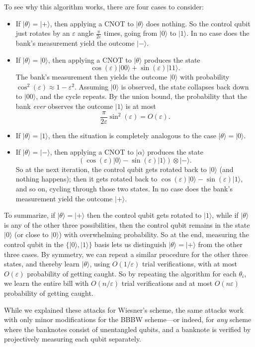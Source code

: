 \documentclass[11pt]{report}
\theoremstyle{plain}
\theoremstyle{definition}
\newcommand{\eps}{\varepsilon}
\renewcommand{\ket}[1]{|#1\rangle}
\begin{document}
To see why this algorithm works, there are four cases to consider:

\begin{itemize}
\item If $\ket{\theta}=\ket{+}$, then applying a CNOT to $\ket{\theta}$ does nothing.  So the control qubit just rotates by an $\eps$ angle $\frac{\pi}{2 \eps}$ times, going from $\ket{0}$ to $\ket{1}$. In no case does the bank's measurement yield the outcome $\ket{-}$.
\item If $\ket{\theta}=\ket{0}$, then applying a CNOT to $\ket{\theta}$ produces the state
$$ \cos(\eps) \ket{00} + \sin(\eps) \ket{11}. $$
The bank's measurement then yields the outcome $\ket{0}$ with probability $\cos^2 (\eps) \approx 1-\eps^2$.  Assuming $\ket{0}$ is observed, the state collapses back down to $\ket{00}$, and the cycle repeats.  By the union bound, the probability that the bank {\em ever} observes the outcome $\ket{1}$ is at most
$$ \frac{\pi}{2 \eps} \sin^2(\eps) = O(\eps). $$
\item If $\ket{\theta}=\ket{1}$, then the situation is completely analogous to the case $\ket{\theta}=\ket{0}$.
\item If $\ket{\theta}=\ket{-}$, then applying a CNOT to $\ket{\alpha}$ produces the state
$$ (\cos(\eps) \ket{0} - \sin(\eps) \ket{1}) \otimes \ket{-}. $$
So at the next iteration, the control qubit gets rotated back to $\ket{0}$ (and nothing happens); then it gets rotated back to $\cos(\eps) \ket{0} - \sin(\eps) \ket{1}$, and so on, cycling through those two states.  In no case does the bank's measurement yield the outcome $\ket{+}$.
\end{itemize}

To summarize, if $\ket{\theta}=\ket{+}$ then the control qubit gets rotated to $\ket{1}$, while if $\ket{\theta}$ is any of the other three possibilities, then the control qubit remains in the state $\ket{0}$ (or close to $\ket{0}$) with overwhelming probability.  So at the end, measuring the control qubit in the $\{ \ket{0},\ket{1} \}$ basis lets us distinguish $\ket{\theta}=\ket{+}$ from the other three cases.  By symmetry, we can repeat a similar procedure for the other three states, and thereby learn $\ket{\theta}$, using $O(1/ \eps)$ trial verifications, with at most $O(\eps )$ probability of getting caught.  So by repeating the algorithm for each $\theta_i$, we learn the entire bill with $O(n / \eps)$ trial verifications and at most $O(n \eps)$ probability of getting caught.

While we explained these attacks for Wiesner's scheme, the same attacks work with only minor modifications for the BBBW scheme---or indeed, for {\em any} scheme where the banknotes consist of unentangled qubits, and a banknote is verified by projectively measuring each qubit separately.
\end{document}
